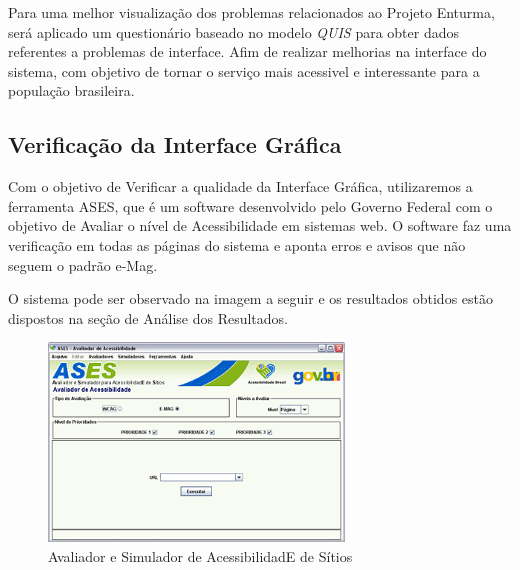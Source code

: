 Para uma melhor visualização dos problemas relacionados ao Projeto Enturma, será aplicado um questionário baseado no modelo \textit{QUIS} para obter dados referentes a problemas de interface. Afim de realizar melhorias na interface do sistema, com objetivo de tornar o serviço mais acessivel e interessante para a população brasileira.

\subsection{Verificação da Interface Gráfica} %
\label{sub:verifica_o_da_interface_gr_fica}

	Com o objetivo de Verificar a qualidade da Interface Gráfica, utilizaremos a ferramenta ASES, que é um software desenvolvido pelo Governo Federal com o objetivo de Avaliar o nível de Acessibilidade em sistemas web. O software faz uma verificação em todas as páginas do sistema e aponta erros e avisos que não seguem o padrão e-Mag.

	O sistema pode ser observado na imagem a seguir e os resultados obtidos estão dispostos na seção de Análise dos Resultados.

	\begin{figure}[H]
		\centering
		\includegraphics[width=0.7\textwidth]{imagens/ASES}
		\caption{Avaliador e Simulador de AcessibilidadE de Sítios}
		\label{img:ASES}
	\end{figure}
